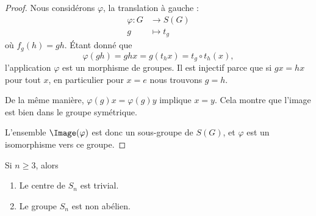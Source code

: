 \begin{proof}
    Nous considérons \( \varphi\), la translation à gauche :
    \begin{equation}
        \begin{aligned}
            \varphi\colon G&\to S(G) \\
            g&\mapsto t_g
        \end{aligned}
    \end{equation}
    où \( f_g(h)=gh\). Étant donné que
    \begin{equation}
        \varphi(gh)= ghx=g(t_hx)=t_g\circ t_h(x),
    \end{equation}
    l'application \( \varphi\) est un morphisme de groupes. Il est injectif parce que si \( gx=hx\) pour tout \( x\), en particulier pour \( x=e\) nous trouvons \( g=h\).

    De la même manière, \( \varphi(g)x=\varphi(g)y\) implique \( x=y\). Cela montre que l'image est bien dans le groupe symétrique.

    L'ensemble \( \Image(\varphi)\) est donc un sous-groupe de \( S(G)\), et \( \varphi\) est un isomorphisme vers ce groupe.
\end{proof}

\begin{lemma}       \label{LEMooMVUGooRiDaDz}
    Si \( n\geq 3\), alors
    \begin{enumerate}
        \item
            Le centre de \( S_n\) est trivial.
        \item
            Le groupe \( S_n\) est non abélien.
    \end{enumerate}
\end{lemma}

